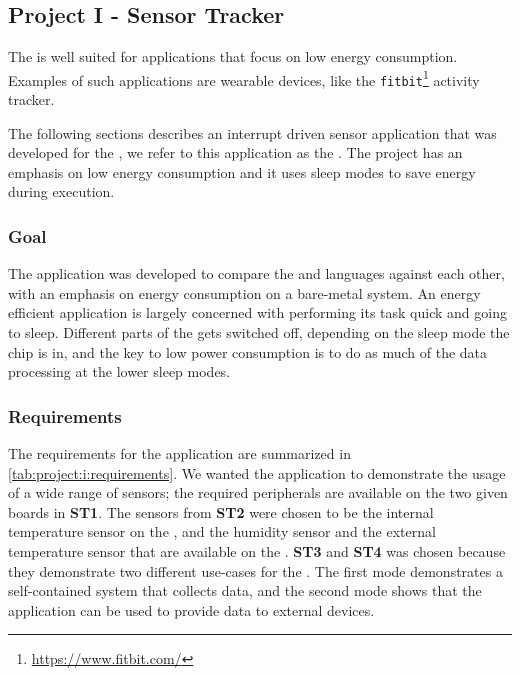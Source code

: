 
\subsection{Project I - Sensor Tracker}
\label{sec:impl:project:i}

\newcommand{\sti}{\textbf{ST1}}
\newcommand{\stii}{\textbf{ST2}}
\newcommand{\stiii}{\textbf{ST3}}
\newcommand{\stiv}{\textbf{ST4}}

The {\gecko} is well suited for applications that focus on low energy consumption.
Examples of such applications are wearable devices, like the \texttt{fitbit}\footnote{\url{https://www.fitbit.com/}} activity tracker.

The following sections describes an interrupt driven sensor application that was developed for the {\STK}, we refer to this application as the {\tracker}.
The project has an emphasis on low energy consumption and it uses sleep modes to save energy during execution.

\subsubsection{Goal}

The {\tracker} application was developed to compare the {\rust} and {\C} languages against each other, with an emphasis on energy consumption on a bare-metal system.
An energy efficient application is largely concerned with performing its task quick and going to sleep.
Different parts of the {\gecko} gets switched off, depending on the sleep mode the chip is in, and the key to low power consumption is to do as much of the data processing at the lower sleep modes.


\subsubsection{Requirements}

The requirements for the {\tracker} application are summarized in \autoref{tab:project:i:requirements}.
We wanted the application to demonstrate the usage of a wide range of sensors; the required peripherals are available on the two given boards in {\sti}.
The sensors from {\stii} were chosen to be the internal temperature sensor on the {\gecko}, and the humidity sensor and the external temperature sensor that are available on the {\BIO}.
{\stiii} and {\stiv} was chosen because they demonstrate two different use-cases for the {\tracker}.
The first mode demonstrates a self-contained system that collects data, and the second mode shows that the application can be used to provide data to external devices.


